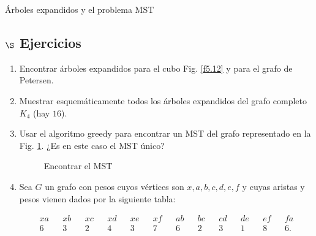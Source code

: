 \begin{section}{Árboles expandidos y el problema MST}
\subsection*{$\S$ Ejercicios}
\begin{enumerate}
    \item Encontrar árboles expandidos para el cubo Fig. \ref{f5.12} y para el grafo de Petersen.

    \item Muestrar esquemáticamente todos los árboles expandidos del grafo completo $K_4$ (hay $16$).    

    \item Usar el algoritmo greedy para encontrar un MST del grafo representado en la Fig. \ref{f6.5}. ¿Es en este caso el MST único?
    \begin{figure}[ht]
    \begin{center}
    \end{center}
    \caption{Encontrar el MST} \label{f6.5}
\end{figure}

\item Sea $G$ un grafo con pesos cuyos vértices son $x,a,b,c,d,e,f$ y cuyas aristas y pesos vienen dados por la siguiente tabla:

\begin{align*}
xa &&xb &&xc &&xd &&xe &&xf &&ab &&bc &&cd &&de &&ef &&fa \\
6  &&3  &&2  &&4  &&3  &&7  &&6  &&2  &&3  &&1  &&8  &&6.
\end{align*}


\end{enumerate}
\end{section}

